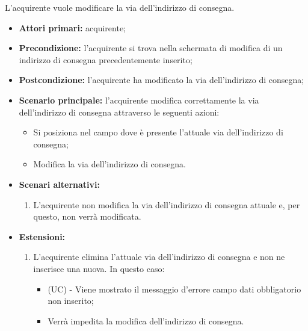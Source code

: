 L'acquirente vuole modificare la via dell'indirizzo di consegna.
\begin{itemize}
    \item \textbf{Attori primari:} acquirente;
    \item \textbf{Precondizione:} l'acquirente si trova nella schermata di modifica di un indirizzo di consegna precedentemente inserito;
    \item \textbf{Postcondizione:} l'acquirente ha modificato la via dell'indirizzo di consegna;
    \item \textbf{Scenario principale:} l'acquirente modifica correttamente la via dell'indirizzo di consegna attraverso le seguenti azioni:
    \begin{itemize}
        \item Si posiziona nel campo dove è presente l'attuale via dell'indirizzo di consegna;
        \item Modifica la via dell'indirizzo di consegna.
    \end{itemize}
    \item \textbf{Scenari alternativi:}
    \begin{enumerate}[label=\lett]
        \item L'acquirente non modifica la via dell'indirizzo di consegna attuale e, per questo, non verrà modificata.
    \end{enumerate}
    \item \textbf{Estensioni:}
    \begin{enumerate}[label=\lett]
        \item L'acquirente elimina l'attuale via dell'indirizzo di consegna e non ne inserisce una nuova. In questo caso:
        \begin{itemize}
            \item (UC) - Viene mostrato il messaggio d'errore campo dati obbligatorio non inserito;
            \item Verrà impedita la modifica dell'indirizzo di consegna.
        \end{itemize}
    \end{enumerate}
\end{itemize}

